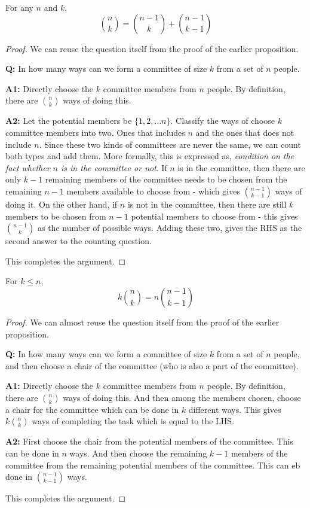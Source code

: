 \begin{proposition}
For any $n$ and $k$,
$${n \choose k} = {n-1 \choose k} + {n-1 \choose k-1}$$
\end{proposition}
\begin{proof}
We can reuse the question itself from the proof of the earlier proposition.
\begin{description}
\item{\bf Q:} In how many ways can we form a committee of size $k$ from a set of $n$ people.
\item{\bf A1:} Directly choose the $k$ committee members from $n$ people. By definition, there are ${n \choose k}$ ways of doing this.
\item{\bf  A2:} Let the potential members be $\{1,2, \ldots n\}$. Classify the ways of choose $k$ committee members into two. Ones that includes $n$ and the ones that does not include $n$. Since these two kinds of committees are never the same, we can count both types and add them. More formally, this is expressed as, \textit{condition on the fact whether $n$ is in the committee or not}. If $n$ is in the committee, then there are only $k-1$ remaining members of the committee needs to be chosen from the remaining $n-1$ members available to choose from - which gives ${n-1 \choose k-1}$ ways of doing it. On the other hand, if $n$ is not in the committee, then there are still $k$ members to be chosen from $n-1$ potential members to choose from - this gives ${n-1 \choose k}$ as the number of possible ways. Adding these two, gives the RHS as the second answer to the counting question.
\end{description}
This completes the argument.
\end{proof}

\begin{proposition}
For $k \le n$,
$$ k{n \choose k} = n {n-1 \choose k-1}$$
\end{proposition}
\begin{proof}
We can almost reuse the question itself from the proof of the earlier proposition.
\begin{description}
\item{\bf Q:} In how many ways can we form a committee of size $k$ from a set of $n$ people, and then choose a chair of the committee (who is also  a part of the committee).
\item{\bf A1:} Directly choose the $k$ committee members from $n$ people. By definition, there are ${n \choose k}$ ways of doing this. And then among the members chosen, choose a chair for the committee which can be done in $k$ different ways. This gives $k {n \choose k}$ ways of completing the task which is equal to the LHS.
\item{\bf  A2:} First choose the chair from the potential members of the committee. This can be done in $n$ ways. And then choose the remaining $k-1$ members of the committee from the remaining potential members of the committee. This can eb done in ${n-1 \choose k-1}$ ways.
\end{description}
This completes the argument.
\end{proof}

